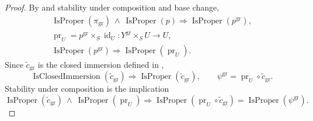 \begin{proof}
  By  and stability under composition and
  base change,
  \[
  \begin{gathered}
    \operatorname{IsProper}(\pi_{\mathrm{gr}})
      \ \wedge\ \operatorname{IsProper}(p)
      \Longrightarrow\operatorname{IsProper}(p^{\mathrm{gr}}),\\
    \operatorname{pr}_U
      =p^{\mathrm{gr}}\times_S\operatorname{id}_U
      \colon Y^{\mathrm{gr}}\times_SU\to U,\\
    \operatorname{IsProper}(p^{\mathrm{gr}})
      \Longrightarrow\operatorname{IsProper}(\operatorname{pr}_U).
  \end{gathered}                                                    \tag{GE1}
  \]
  Since $\widetilde c_{\mathrm{gr}}$ is the closed immersion defined in
  ,
  \[
    \operatorname{IsClosedImmersion}(\widetilde c_{\mathrm{gr}})
      \Longrightarrow\operatorname{IsProper}(\widetilde c_{\mathrm{gr}}),
    \qquad
    \psi^{\mathrm{gr}}
      =\operatorname{pr}_U\circ\widetilde c_{\mathrm{gr}}.        \tag{GE2}
  \]
  Stability under composition is the implication
  \[
    \operatorname{IsProper}(\widetilde c_{\mathrm{gr}})
      \ \wedge\ 
    \operatorname{IsProper}(\operatorname{pr}_U)
      \Longrightarrow
    \operatorname{IsProper}
      (\operatorname{pr}_U\circ\widetilde c_{\mathrm{gr}})
      =\operatorname{IsProper}(\psi^{\mathrm{gr}}).
  \]


\end{proof}
